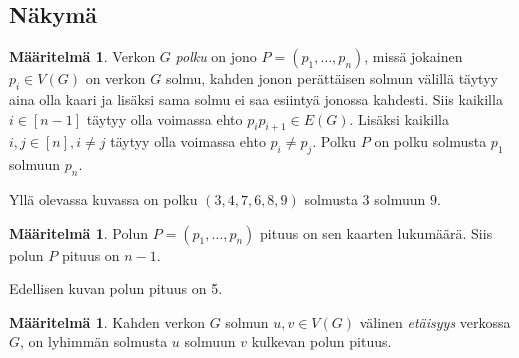 \documentclass[finnish]{tktltiki2}
\theoremstyle{definition}
\newtheorem{maar}[lau]{Määritelmä}
\theoremstyle{remark}
\begin{document}
\subsection{Näkymä}

\begin{maar}
    Verkon $G$ \emph{polku} on jono $P = (p_1, \dots, p_n)$, missä jokainen
    $p_i \in V(G)$ on verkon $G$ solmu, kahden jonon perättäisen solmun välillä
    täytyy aina olla kaari ja lisäksi sama solmu ei saa esiintyä jonossa
    kahdesti. Siis kaikilla $i \in [n-1]$ täytyy olla voimassa ehto $p_i
    p_{i+1} \in E(G)$. Lisäksi kaikilla $i,j \in [n], i \neq j$ täytyy olla
    voimassa ehto $p_i \neq p_j$. Polku $P$ on polku solmusta $p_1$ solmuun
    $p_n$.
\end{maar}

\begin{center}
\end{center}

Yllä olevassa kuvassa on polku $(3,4,7,6,8,9)$ solmusta $3$ solmuun $9$.

\begin{maar}
    Polun $P = (p_1, \dots, p_n)$ pituus on sen kaarten lukumäärä. Siis polun
    $P$ pituus on $n-1$.
\end{maar}

Edellisen kuvan polun pituus on 5.

\begin{maar}
    Kahden verkon $G$ solmun $u,v \in V(G)$ välinen \emph{etäisyys} verkossa
    $G$, on lyhimmän solmusta $u$ solmuun $v$ kulkevan polun pituus.
\end{maar}
\end{document}
